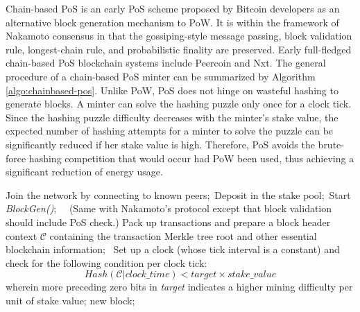 \label{subsec:chainbased-pos}
Chain-based PoS is an early PoS scheme proposed by Bitcoin developers as an alternative block generation mechanism to PoW. It is within the framework of Nakamoto consensus in that the gossiping-style message passing, block validation rule, longest-chain rule, and probabilistic finality are preserved. Early full-fledged chain-based PoS blockchain systems include Peercoin and Nxt. 
The general procedure of a chain-based PoS minter can be summarized by Algorithm \ref{algo:chainbased-pos}.
Unlike PoW, PoS does not hinge on wasteful hashing to generate blocks. A minter can solve the hashing puzzle only once for a clock tick.
Since the hashing puzzle difficulty decreases with the minter's stake value, the expected number of hashing attempts for a minter to solve the puzzle can be significantly reduced if her stake value is high.
Therefore, PoS avoids the brute-force hashing competition that would occur had PoW been used, thus achieving a significant reduction of energy usage.
\begin{algorithm}
\label{algo:chainbased-pos}
\caption{Chain-based PoS general procedure (Peercoin, Nxt)}
\SetAlgoLined
{}
\setcounter{AlgoLine}{0}
Join the network by connecting to known peers;\
Deposit in the stake pool;\
Start \textit{BlockGen()};\
\
{
    (Same with Nakamoto's protocol except that block validation should include PoS check.)
}
{
    Pack up transactions and prepare a block header context $\mathcal{C}$ containing the transaction Merkle tree root and other essential blockchain information;\
    Set up a clock (whose tick interval is a constant) and check for the following condition per clock tick:
    \begin{equation*}
        Hash(\mathcal{C}|\textit{clock\_time}) < \textit{target} \times \textit{stake\_value}
    \end{equation*}
    wherein more preceding zero bits in \textit{target} indicates a higher mining difficulty per unit of stake value;
    \KwRet new block;
}
\end{algorithm}

